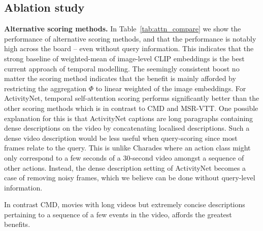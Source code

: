 \subsection{Ablation study}
\label{subsec:ablation}

\noindent\textbf{Alternative scoring methods.}
In Table~\ref{tab:attn_compare} we show the performance of alternative scoring methods, and that the performance is notably high across the board -- even without query information. This indicates that the strong baseline of weighted-mean of image-level CLIP embeddings is the best current approach of temporal modelling. The seemingly consistent boost no matter the scoring method indicates that the benefit is mainly afforded by restricting the aggregation $\Phi$ to linear weighted of the image embeddings. For ActivityNet, temporal self-attention scoring performs significantly better than the other scoring methods which is in contrast to CMD and MSR-VTT. One possible explanation for this is that ActivityNet captions are long paragraphs containing dense descriptions on the video by concatenating localised descriptions. Such a dense video description would be less useful when query-scoring since most frames relate to the query. This is unlike Charades where an action class might only correspond to a few seconds of a 30-second video amongst a sequence of other actions. Instead, the dense description setting of ActivityNet becomes a case of removing noisy frames, which we believe can be done without query-level information.

In contrast CMD, movies with long videos but extremely concise descriptions pertaining to a sequence of a few events in the video, affords the greatest benefits.

